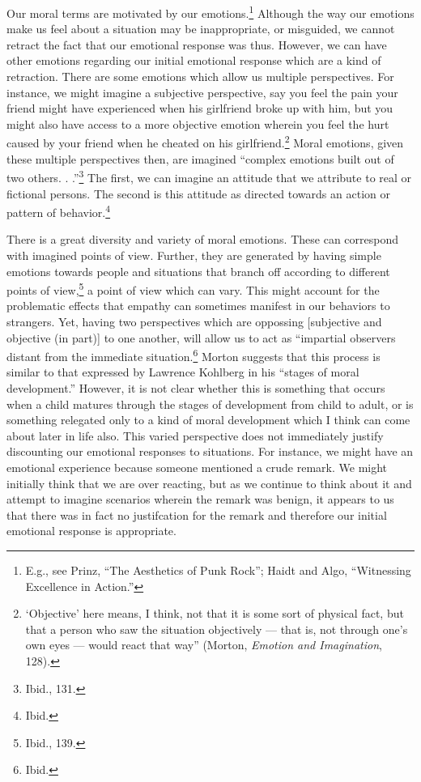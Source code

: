 \documentclass[phdthesis,12pt,final]{wuthesis}
\theoremstyle{definition}
\theoremstyle{definition}
\theoremstyle{definition}
\theoremstyle{definition}
\theoremstyle{remark}
\begin{document}
Our moral terms are motivated by our emotions.\footnote{E.g., see Prinz, {``The {Aesthetics} of {Punk Rock}''}; Haidt and Algo, {``Witnessing {Excellence} in {Action}.''}} Although the way our emotions make us feel about a situation may be inappropriate, or misguided, we cannot retract the fact that our emotional response was thus. However, we can have other emotions regarding our initial emotional response which are a kind of retraction. There are some emotions which allow us multiple perspectives. For instance, we might imagine a subjective perspective, say you feel the pain your friend might have experienced when his girlfriend broke up with him, but you might also have access to a more objective emotion wherein you feel the hurt caused by your friend when he cheated on his girlfriend.\footnote{`Objective' here means, I think, not that it is some sort of physical fact, but that a person who saw the situation objectively --- that is, not through one's own eyes --- would react that way'' (Morton, \emph{Emotion and {Imagination}}, 128).} Moral emotions, given these multiple perspectives then, are imagined ``complex emotions built out of two others. . .''\footnote{Ibid., 131.} The first, we can imagine an attitude that we attribute to real or fictional persons. The second is this attitude as directed towards an action or pattern of behavior.\footnote{Ibid.}

There is a great diversity and variety of moral emotions. These can correspond with imagined points of view. Further, they are generated by having simple emotions towards people and situations that branch off according to different points of view,\footnote{Ibid., 139.} a point of view which can vary. This might account for the problematic effects that empathy can sometimes manifest in our behaviors to strangers. Yet, having two perspectives which are oppossing {[}subjective and objective (in part){]} to one another, will allow us to act as ``impartial observers distant from the immediate situation.\footnote{Ibid.} Morton suggests that this process is similar to that expressed by Lawrence Kohlberg in his ``stages of moral development.'' However, it is not clear whether this is something that occurs when a child matures through the stages of development from child to adult, or is something relegated only to a kind of moral development which I think can come about later in life also. This varied perspective does not immediately justify discounting our emotional responses to situations. For instance, we might have an emotional experience because someone mentioned a crude remark. We might initially think that we are over reacting, but as we continue to think about it and attempt to imagine scenarios wherein the remark was benign, it appears to us that there was in fact no justifcation for the remark and therefore our initial emotional response is appropriate.
\end{document}
